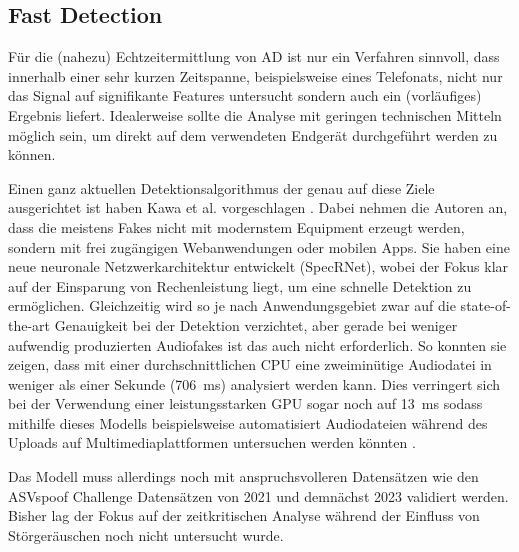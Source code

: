 \subsection{Fast Detection}
Für die (nahezu) Echtzeitermittlung von AD ist nur ein Verfahren sinnvoll, dass innerhalb einer sehr kurzen Zeitspanne, beispielsweise eines Telefonats, nicht nur das Signal auf signifikante Features untersucht sondern auch ein (vorläufiges) Ergebnis liefert.
Idealerweise sollte die Analyse mit geringen technischen Mitteln möglich sein, um direkt auf dem verwendeten Endgerät durchgeführt werden zu können.

Einen ganz aktuellen Detektionsalgorithmus der genau auf diese Ziele ausgerichtet ist haben Kawa et al. vorgeschlagen \citep[][]{Kawa2022}.
Dabei nehmen die Autoren an, dass die meistens Fakes nicht mit modernstem Equipment erzeugt werden, sondern mit frei zugängigen Webanwendungen oder mobilen Apps.
Sie haben eine neue neuronale Netzwerkarchitektur entwickelt (SpecRNet), wobei der Fokus klar auf der Einsparung von Rechenleistung liegt, um eine schnelle Detektion zu ermöglichen.
Gleichzeitig wird so je nach Anwendungsgebiet zwar auf die state-of-the-art Genauigkeit bei der Detektion verzichtet, aber gerade bei weniger aufwendig produzierten Audiofakes ist das auch nicht erforderlich.
So konnten sie zeigen, dass mit einer durchschnittlichen CPU eine zweiminütige Audiodatei in weniger als einer Sekunde (\SI{706}{\milli\second}) analysiert werden kann.
Dies verringert sich bei der Verwendung einer leistungsstarken GPU sogar noch auf \SI{13}{\milli\second} sodass mithilfe dieses Modells beispielsweise automatisiert Audiodateien während des Uploads auf Multimediaplattformen untersuchen werden könnten \citep[][]{Kawa2022}.

Das Modell muss allerdings noch mit anspruchsvolleren Datensätzen wie den ASVspoof Challenge Datensätzen von 2021 und demnächst 2023 validiert werden.
Bisher lag der Fokus auf der zeitkritischen Analyse während der Einfluss von Störgeräuschen noch nicht untersucht wurde.